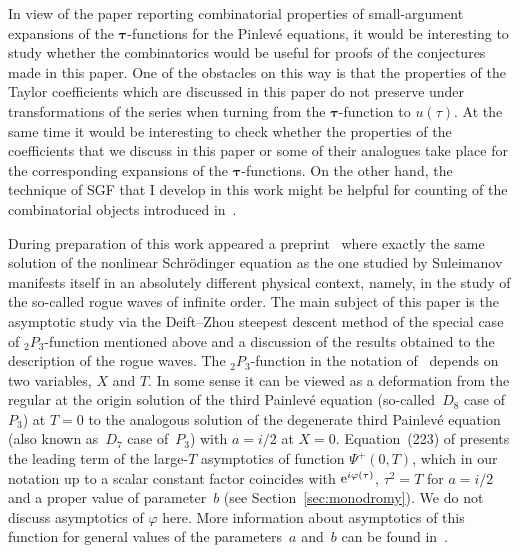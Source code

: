 \documentclass[pdftex]{sigma}
\numberwithin{equation}{section}
\begin{document}
In view of the paper \cite{GIL2013} reporting combinatorial properties of small-argument expansions of
the $\boldsymbol{\tau}$-functions for the Pinlev\'e equations, it would be interesting to study whether the
combinatorics would be useful for proofs of the conjectures made in this paper. One of the obstacles on this way is that the
properties of the Taylor coefficients which are discussed in this paper do not preserve under transformations of
the series when turning from the $\boldsymbol{\tau}$-function to $u(\tau)$. At the same time it would be
interesting to check whether the properties of the coefficients that we discuss in this paper or some of their
analogues take place for the corresponding expansions of the $\boldsymbol{\tau}$-functions. On the other hand,
the technique of SGF that I develop in this work might be helpful for counting of the combinatorial objects
introduced in~\cite{GIL2013}.

During preparation of this work appeared a preprint~\cite{BLM} where exactly the same solution
of the nonlinear Schr\"odinger equation as the one studied by Suleimanov manifests itself in an absolutely
different physical context, namely, in the study of the so-called rogue waves of infinite order. The main subject of this paper is
the asymptotic study via the Deift--Zhou steepest descent method of the special case of ${}_2P_3$-function mentioned
above and a discussion of the results obtained to the description of the rogue waves. The ${}_2P_3$-function in
the notation of~\cite{BLM} depends on two variables, $X$ and $T$. In some sense it can be viewed as a deformation
from the regular at the origin solution of the third Painlev\'e equation (so-called~$D_8$ case of~$P_3$) at $T=0$
to the analogous solution of the degenerate third Painlev\'e equation (also known as~$D_7$ case of~$P_3$)
with $a=i/2$ at $X=0$. Equation~(223) of \cite{BLM} presents the leading term of the large-$T$ asymptotics of function $\Psi^+(0,T)$,
which in our notation up to a scalar constant factor coincides with ${\rm e}^{i\varphi(\tau)}$, $\tau^2=T$ for
$a=i/2$ and a proper value of parameter~$b$ (see Section~\ref{sec:monodromy}). We do not discuss asymptotics
of $\varphi$ here. More information about asymptotics of this function for general values of the parame\-ters~$a$ and~$b$ can be found in~\cite{KVdP3int}.
\end{document}
